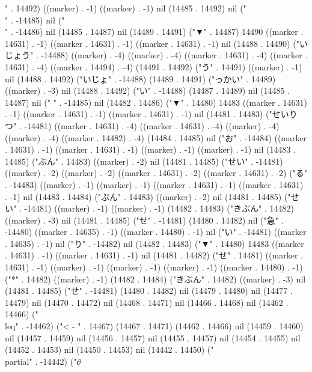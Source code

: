 " . 14492) ((marker) . -1) ((marker) . -1) nil (14485 . 14492) nil ("\\" . -14485) nil ("\\" . -14486) nil (14485 . 14487) nil (14489 . 14491) ("▼" . 14487) 14490 ((marker . 14631) . -1) ((marker . 14631) . -1) ((marker . 14631) . -1) nil (14488 . 14490) ("いじょう" . -14488) ((marker) . -4) ((marker) . -4) ((marker . 14631) . -4) ((marker . 14631) . -4) ((marker . 14494) . -4) (14491 . 14492) ("う" . 14491) ((marker) . -1) nil (14488 . 14492) ("いじょ" . -14488) (14489 . 14491) ("っかい" . 14489) ((marker) . -3) nil (14488 . 14492) ("い" . -14488) (14487 . 14489) nil (14485 . 14487) nil (" " . -14485) nil (14482 . 14486) ("▼" . 14480) 14483 ((marker . 14631) . -1) ((marker . 14631) . -1) ((marker . 14631) . -1) nil (14481 . 14483) ("せいりつ" . -14481) ((marker . 14631) . -4) ((marker . 14631) . -4) ((marker) . -4) ((marker) . -4) ((marker . 14482) . -4) (14484 . 14485) nil ("お" . -14484) ((marker . 14631) . -1) ((marker . 14631) . -1) ((marker) . -1) ((marker) . -1) nil (14483 . 14485) ("ぶん" . 14483) ((marker) . -2) nil (14481 . 14485) ("せい" . -14481) ((marker) . -2) ((marker) . -2) ((marker . 14631) . -2) ((marker . 14631) . -2) ("る" . -14483) ((marker) . -1) ((marker) . -1) ((marker . 14631) . -1) ((marker . 14631) . -1) nil (14483 . 14484) ("ぶん" . 14483) ((marker) . -2) nil (14481 . 14485) ("せい" . -14481) ((marker) . -1) ((marker) . -1) (14482 . 14483) ("きぶん" . 14482) ((marker) . -3) nil (14481 . 14485) ("せ" . -14481) (14480 . 14482) nil ("急" . -14480) ((marker . 14635) . -1) ((marker . 14480) . -1) nil ("い" . -14481) ((marker . 14635) . -1) nil ("り" . -14482) nil (14482 . 14483) ("▼" . 14480) 14483 ((marker . 14631) . -1) ((marker . 14631) . -1) nil (14481 . 14482) ("せ" . 14481) ((marker . 14631) . -1) ((marker) . -1) ((marker) . -1) ((marker) . -1) ((marker . 14480) . -1) ("*" . 14482) ((marker) . -1) (14482 . 14484) ("きぶん" . 14482) ((marker) . -3) nil (14481 . 14485) ("せ" . -14481) (14480 . 14482) nil (14479 . 14480) nil (14477 . 14479) nil (14470 . 14472) nil (14468 . 14471) nil (14466 . 14468) nil (14462 . 14466) ("\\leq" . -14462) ("<
-
" . 14467) (14467 . 14471) (14462 . 14466) nil (14459 . 14460) nil (14457 . 14459) nil (14456 . 14457) nil (14455 . 14457) nil (14454 . 14455) nil (14452 . 14453) nil (14450 . 14453) nil (14442 . 14450) ("\\partial" . -14442) ("∂
